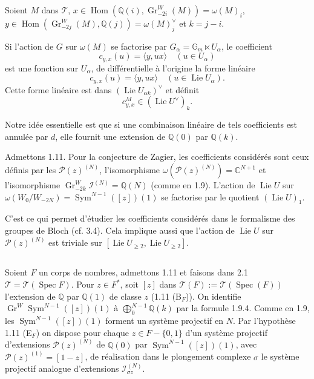 \documentclass[12pt,a4paper]{article}
\theoremstyle{plain}
\theoremstyle{definition}
\theoremstyle{remark}
\DeclareMathOperator{\Hom}{Hom}
\DeclareMathOperator{\Sym}{Sym}
\DeclareMathOperator{\Spec}{Spec}
\DeclareMathOperator{\Lie}{Lie}
\newcommand{\Q}{\mathbb{Q}}
\newcommand{\C}{\mathbb{C}}
\newcommand{\Gm}{\mathbb{G}_m}
\begin{document}
Soient $M$ dans $\mathcal{T}$, $x\in\Hom(\Q(i),\operatorname{Gr}^W_{-2i}(M))=\omega(M)_i$, $y\in\Hom(\operatorname{Gr}^W_{-2j}(M),\Q(j))=\omega(M)_j^\vee$ et $k=j-i$.

Si l'action de $G$ sur $\omega(M)$ se factorise par $G_\alpha=\Gm\ltimes U_\alpha$, le coefficient
\begin{equation*}
c_{y,x}(u) = \langle y,ux\rangle \quad (u\in U_\alpha)
\end{equation*}
est une fonction sur $U_\alpha$, de diff{\'e}rentielle {\`a} l'origine la forme lin{\'e}aire
\begin{equation*}
c_{y,x}(u) = \langle y,ux\rangle \quad (u\in\Lie U_\alpha).
\end{equation*}
Cette forme lin{\'e}aire est dans $(\Lie U_{\alpha k})^\vee$ et d{\'e}finit
\begin{equation*}
c_{y,x}^M\in(\Lie U^\vee)_k.
\end{equation*}

Notre id{\'e}e essentielle est que si une combinaison lin{\'e}aire de tels coefficients est annul{\'e}e par $d$, elle fournit une extension de $\Q(0)$ par $\Q(k)$.

Admettons 1.11. Pour la conjecture de Zagier, les coefficients consid{\'e}r{\'e}s sont ceux d{\'e}finis par les $\mathcal{P}(z)^{(N)}$, l'isomorphisme $\omega(\mathcal{P}(z)^{(N)})=\C^{N+1}$ et l'isomorphisme $\operatorname{Gr}^W_{-2k}\mathcal{I}^{(N)}=\Q(N)$ (comme en 1.9). L'action de $\Lie U$ sur $\omega(W_0/W_{-2N})=\Sym^{N-1}([z])(1)$ se factorise par le quotient $(\Lie U)_1$.

C'est ce qui permet d'{\'e}tudier les coefficients consid{\'e}r{\'e}s dans le formalisme des groupes de Bloch (cf. 3.4). Cela implique aussi que l'action de $\Lie U$ sur $\mathcal{P}(z)^{(N)}$ est triviale sur $[\Lie U_{\geq 2},\Lie U_{\geq 2}]$.

\subsection{}

Soient $F$ un corps de nombres, admettons 1.11 et faisons dans 2.1 $\mathcal{T}=\mathcal{T}(\Spec F)$. Pour $z\in F^*$, soit $[z]$ dans $\mathcal{T}(F):=\mathcal{T}(\Spec(F))$ l'extension de $\Q$ par $\Q(1)$ de classe $z$ (1.11 (B$_F$)). On identifie $\operatorname{Gr}^W\Sym^{N-1}([z])(1)$ {\`a} $\bigoplus_0^{N-1}\Q(k)$ par la formule 1.9.4. Comme en 1.9, les $\Sym^{N-1}([z])(1)$ forment un syst{\`e}me projectif en $N$. Par l'hypoth{\`e}se 1.11 (E$_F$) on dispose pour chaque $z\in F-\{0,1\}$ d'un syst{\`e}me projectif d'extensions $\mathcal{P}(z)^{(N)}$ de $\Q(0)$ par $\Sym^{N-1}([z])(1)$, avec $\mathcal{P}(z)^{(1)}=[1-z]$, de r{\'e}alisation dans le plongement complexe $\sigma$ le syst{\`e}me projectif analogue d'extensions $\mathcal{I}^{(N)}_{\sigma z}$.
\end{document}
